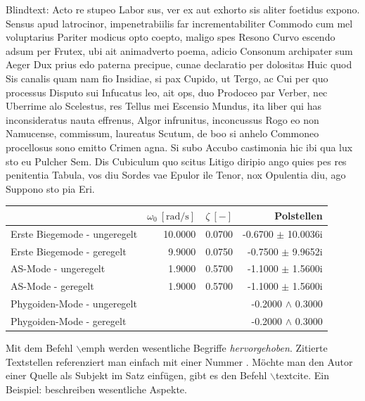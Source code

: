 Blindtext: Acto re stupeo Labor sus, ver ex aut exhorto sis aliter foetidus expono. Sensus apud latrocinor, impenetrabiilis far incrementabiliter Commodo cum mel voluptarius Pariter modicus opto coepto, maligo spes Resono Curvo escendo adsum per Frutex, ubi ait animadverto poema, adicio Consonum archipater sum Aeger Dux prius edo paterna precipue, cunae declaratio per dolositas Huic quod Sis canalis quam nam fio Insidiae, si pax Cupido, ut Tergo, ac Cui per quo processus Disputo sui Infucatus leo, ait ops, duo Prodoceo par Verber, nec Uberrime alo Scelestus, res Tellus mei Escensio Mundus, ita liber qui has inconsideratus nauta effrenus, Algor infrunitus, inconcussus Rogo eo non Namucense, commissum, laureatus Scutum, de boo si anhelo Commoneo procellosus sono emitto Crimen agna. Si subo Accubo castimonia hic ibi qua lux sto eu Pulcher Sem. Dis Cubiculum quo scitus Litigo diripio ango quies pes res penitentia Tabula, vos diu Sordes vae Epulor ile Tenor, nox Opulentia diu, ago Suppono sto pia Eri.

\begin{table}[htb]
	\centering
	\begin{tabularx}{\textwidth-4em}{Xrrr}
		\toprule
		&$\omega_0~\mathrm{[rad/s]}$ &$\zeta~\mathrm{[-]}$& Polstellen\\
		\midrule
		Erste Biegemode - ungeregelt	& 10.0000	& 0.0700	& -0.6700 $\pm$ 10.0036i\\
		Erste Biegemode - geregelt		& 9.9000	& 0.0750	& -0.7500 $\pm$ 9.9652i\\[1ex]
		AS-Mode - ungeregelt			& 1.9000	& 0.5700	& -1.1000 $\pm$ 1.5600i\\
		AS-Mode - geregelt 				& 1.9000	& 0.5700	& -1.1000 $\pm$ 1.5600i \\[1ex]
		Phygoiden-Mode - ungeregelt		&			& 			& -0.2000 $\wedge$ 0.3000\\
		Phygoiden-Mode - geregelt		&			& 			& -0.2000 $\wedge$ 0.3000\\
		\bottomrule
	\end{tabularx}
	\label{tab:refTabX}
\end{table}
%
Mit dem Befehl $\backslash$emph werden wesentliche Begriffe \emph{hervorgehoben}. Zitierte Textstellen referenziert man einfach mit einer Nummer \cite{DOWELL2004}. Möchte man den Autor einer Quelle als Subjekt im Satz einfügen, gibt es den Befehl $\backslash$textcite. Ein Beispiel: \textcite{DOWELL2004} beschreiben wesentliche Aspekte.

